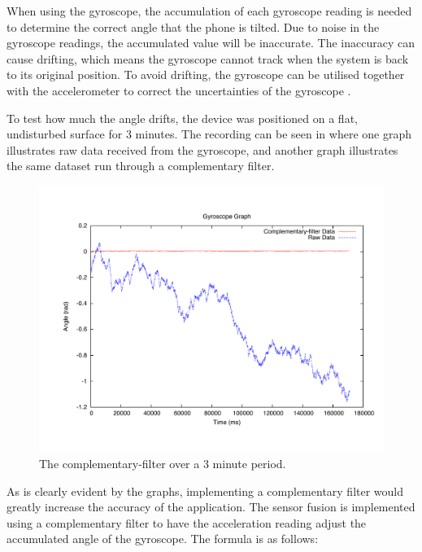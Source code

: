When using the gyroscope, the accumulation of each gyroscope reading is needed to determine the correct angle that the phone is tilted. 
Due to noise in the gyroscope readings, the accumulated value will be inaccurate.
The inaccuracy can cause drifting, which means the gyroscope cannot track when the system is back to its original position.
To avoid drifting, the gyroscope can be utilised together with the accelerometer to correct the uncertainties of the gyroscope \citep{misc:pieter-jan, misc:balance-filter}.

To test how much the angle drifts, the device was positioned on a flat, undisturbed surface for 3 minutes.
The recording can be seen in  where one graph illustrates raw data received from the gyroscope, and another graph illustrates the same dataset run through a complementary filter.

\begin{figure}[h]
	\centering
	\includegraphics[scale=0.45, trim = 0cm 2cm 0cm 2cm]{media/gnuplot/compfilter.pdf}
	\caption{The complementary-filter over a 3 minute period.}
	\label{figure:phone-complementary-filter}
\end{figure}

As is clearly evident by the graphs, implementing a complementary filter would greatly increase the accuracy of the application.
The sensor fusion is implemented using a complementary filter to have the acceleration reading adjust the accumulated angle of the gyroscope.
The formula is as follows:


